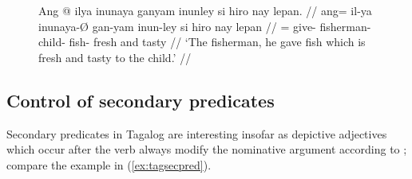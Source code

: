 \begin{figure}[h]
\ex\label{ex:ayrrel3}\begingl
	\gla Ang @ ilya inunaya ganyam inunley si hiro nay lepan. //
	\glb ang= il-ya inunaya-Ø gan-yam inun-ley si hiro nay lepan //
	\glc \AgtT{}= give-\TsgM{} fisherman-\Top{} child-\Dat{} fish-\PargI{}
	\Rel{} fresh and tasty //
	\glft `The fisherman, he gave fish which is fresh and tasty to the
		child.' //
\endgl\xe
\end{figure}


\subsection{Control of secondary predicates}
\label{subsec:secpredctrl}

Secondary predicates in Tagalog are interesting insofar as depictive adjectives
which occur after the verb always modify the nominative argument according to
\citet{kroeger1991}; compare the example in (\ref{ex:tagsecpred}).

